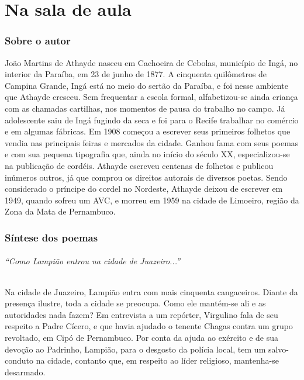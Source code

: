 \part{Na sala de aula}

\paginabranca

\section{Sobre o autor}

João Martins de Athayde nasceu em Cachoeira de Cebolas, município de
Ingá, no interior da Paraíba, em 23 de junho de 1877. A cinquenta
quilômetros de Campina Grande, Ingá está no meio do sertão da Paraíba,
e foi nesse ambiente que Athayde cresceu. Sem frequentar a escola
formal, alfabetizou-se ainda criança com as chamadas cartilhas, nos
momentos de pausa do trabalho no campo. Já adolescente saiu de Ingá
fugindo da seca e foi para o Recife trabalhar no comércio e em
algumas fábricas. Em 1908 começou a escrever seus primeiros folhetos
que vendia nas principais feiras e mercados da cidade. Ganhou fama com
seus poemas e com sua pequena tipografia que, ainda no início do século
XX, especializou-se na publicação de cordéis. Athayde escreveu centenas
de folhetos e publicou inúmeros outros, já que comprou os direitos
autorais de diversos poetas. Sendo considerado o príncipe do cordel no
Nordeste, Athayde deixou de escrever em 1949, quando sofreu um AVC, e
morreu em 1959 na cidade de Limoeiro, região da Zona da Mata de
Pernambuco.

\pagebreak
\section{Síntese dos poemas}

\paragraph{``Como Lampião entrou na cidade de
Juazeiro...''}

Na cidade de Juazeiro, Lampião entra com mais cinquenta cangaceiros. Diante da
presença ilustre, toda a cidade se preocupa. Como ele mantém-se ali e as
autoridades nada fazem? Em entrevista a um repórter, Virgulino fala de
seu respeito a Padre Cícero, e que havia ajudado o tenente Chagas
contra um grupo revoltado, em Cipó de Pernambuco. Por conta da ajuda ao
exército e de sua devoção ao Padrinho, Lampião, para o desgosto da
polícia local, tem um salvo-conduto na cidade, contanto que, em respeito
ao líder religioso, mantenha-se desarmado. 

